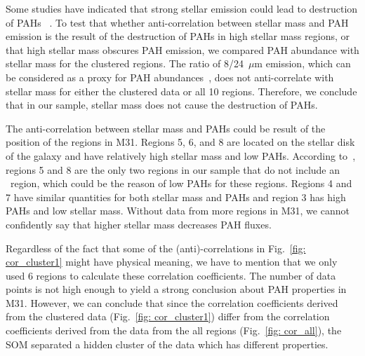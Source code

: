         Some studies have indicated that strong stellar emission could lead to destruction of PAHs ~\citep[e.g.][]{Clayton03,Seok14}.
        To test that whether anti-correlation between stellar mass and PAH emission is the result of the destruction of PAHs in high stellar mass regions, or that high stellar mass obscures PAH emission, we compared PAH abundance with stellar mass for the clustered regions.
        The ratio of 8/24~$\mu$m emission, which can be considered as a proxy for PAH abundances~\citep[e.g.][]{Sandstrom10,Khramtsova13}, does not anti-correlate with stellar mass for either the clustered data or all 10 regions.
        Therefore, we conclude that in our sample,  stellar mass does not cause the destruction of PAHs.
        
        The anti-correlation between stellar mass and PAHs could be result of the position of the regions in M31.
        Regions 5, 6, and 8 are located on the stellar disk of the galaxy and have relatively high stellar mass and low PAHs. 
        According to~\cite{Dim15}, regions 5 and 8 are the only two regions in our sample that do not include an \hii~region, which could be the reason of low PAHs for these regions.
        Regions 4 and 7 have similar quantities for both stellar mass and PAHs and region 3 has high PAHs and low stellar mass.
        Without data from more regions in M31, we cannot confidently say that higher stellar mass decreases PAH fluxes.
        
        
        
       Regardless of the fact that some of the (anti)-correlations in Fig.~\ref{fig: cor_cluster1} might have physical meaning, we have to mention that we only used 6 regions to calculate these correlation coefficients.
       The number of data points is not high enough to yield a strong conclusion about PAH properties in M31.
        However, we can conclude that since the correlation coefficients derived from the clustered data (Fig.~\ref{fig: cor_cluster1}) differ from the correlation coefficients derived from the data from the all regions (Fig.~\ref{fig: cor_all}), the SOM separated a hidden cluster of the data which has different properties.
        
        
        
